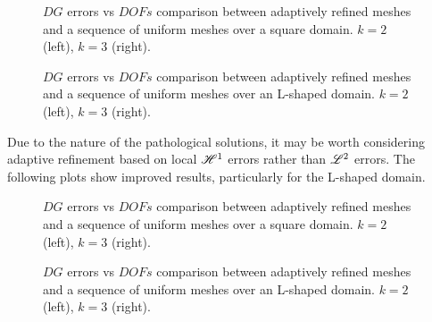 \begin{figure}[!ht]
	\begin{subfigure}[b]{0.45\textwidth}
		
	\end{subfigure}
	\hfill
	\begin{subfigure}[b]{0.45\textwidth}
		
	\end{subfigure}
    \caption{$DG$ errors vs $DOFs$ comparison between adaptively refined meshes and a sequence of uniform meshes over a square domain. $k = 2$ (left), $k = 3$ (right).}
\end{figure}

\begin{figure}[!ht]
	\begin{subfigure}[b]{0.45\textwidth}
		
	\end{subfigure}
	\hfill
	\begin{subfigure}[b]{0.45\textwidth}
		
	\end{subfigure}
    \caption{$DG$ errors vs $DOFs$ comparison between adaptively refined meshes and a sequence of uniform meshes over an L-shaped domain. $k = 2$ (left), $k = 3$ (right).}
\end{figure}

\newpage

Due to the nature of the pathological solutions, it may be worth considering adaptive refinement based on local $\mathscr{H}^1$ errors rather than $\mathscr{L}^2$ errors. The following plots show improved results, particularly for the L-shaped domain.

\begin{figure}[!ht]
	\begin{subfigure}[b]{0.45\textwidth}
		
	\end{subfigure}
	\hfill
	\begin{subfigure}[b]{0.45\textwidth}
		
	\end{subfigure}
    \caption{$DG$ errors vs $DOFs$ comparison between adaptively refined meshes and a sequence of uniform meshes over a square domain. $k = 2$ (left), $k = 3$ (right).}
\end{figure}

\begin{figure}[!ht]
	\begin{subfigure}[b]{0.45\textwidth}
		
	\end{subfigure}
	\hfill
	\begin{subfigure}[b]{0.45\textwidth}
	\end{subfigure}
    \caption{$DG$ errors vs $DOFs$ comparison between adaptively refined meshes and a sequence of uniform meshes over an L-shaped domain. $k = 2$ (left), $k = 3$ (right).}
\end{figure}

